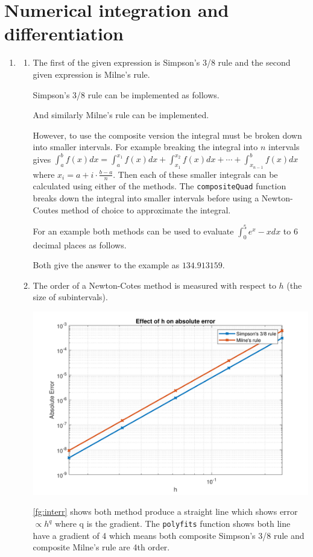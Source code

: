 \documentclass[a4paper,11pt]{article}
\begin{document}
\section{Numerical integration and differentiation}
\begin{enumerate}
	\item \begin{enumerate}
		\item The first of the given expression is Simpson's 3/8 rule and the 
		second given expression is 
		Milne's rule\cite{wiki:nc}.
		
		Simpson's 3/8 rule can be implemented as follows.
		
		And similarly Milne's rule can be implemented.
		
		However, to use the composite version the integral must be broken 
		down 
		into smaller intervals. For example breaking the integral into $n$ 
		intervals gives $\int_{a}^{b}f(x)dx = \int_{a}^{x_{1}}f(x)dx + 
		\int_{x_{1}}^{x_{2}}f(x)dx + \cdots + \int_{x_{n-1}}^{b}f(x)dx$ 
		where 
		$x_{i} = a + i \cdot \frac{b - a}{n}$. Then each of these smaller 
		integrals can be calculated using either of the methods. The 
		\verb*|compositeQuad| function breaks down the integral into smaller 
		intervals before using a Newton-Coutes method of choice to 
		approximate the integral.
		
		For an example both methods can be used to evaluate $\int_{0}^{5} 
		e^{x} - x dx$ to 6 decimal places as follows.
		
		Both give the answer to the example as $134.913159$.
		
		
		\item The order of a Newton-Cotes method is measured with respect to 
		$h$ (the size of subintervals).
		\begin{center}
			\includegraphics[scale=0.7]{images/Q2aii.pdf}
			\label{fg:interr}
		\end{center}
		\autoref{fg:interr} shows both method produce a straight line which 
		shows error $\propto h^{q}$ where q is the gradient. The 
		\verb*|polyfits| function shows both line have a gradient of 4 which 
		means both composite Simpson's 3/8 rule and composite Milne's rule 
		are 4th order.
		

\end{enumerate}
\end{enumerate}
\end{document}
